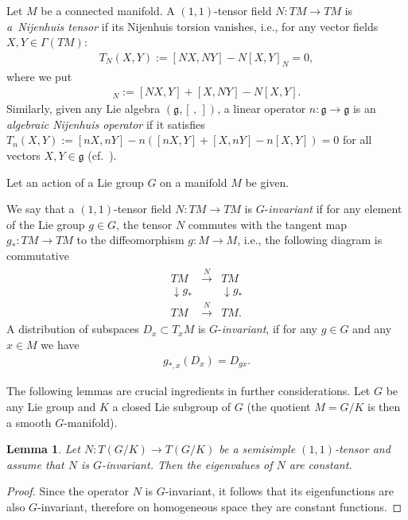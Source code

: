 \documentclass[pdftex]{sigma}
\numberwithin{equation}{section}
\newtheorem{Lemma}[Theorem]{Lemma}
\begin{document}
\begin{Definition}\label{nijdef}Let $M$ be a connected manifold. A $(1,1)$-tensor field $N\colon TM\to TM$ is \emph{a~Nijenhuis tensor} if its Nijenhuis torsion vanishes,
i.e., for any vector fields $X,Y\in \Gamma(TM)$:
\begin{gather*}
 T_N(X,Y):=[NX,NY]-N [X,Y]_N=0,
\end{gather*}
where we put
\begin{gather*}
[X,Y]_N:=[NX,Y]+[X,NY]-N[X,Y].
\end{gather*}
Similarly, given any Lie algebra $(\mathfrak{g}, [\,,\,])$, a linear operator $n\colon \mathfrak{g}\to\mathfrak{g}$ is an \emph{algebraic Nijenhuis operator} if it satisfies
$T_n(X,Y):=[nX,nY]-n ( [nX,Y] + [X,nY] - n[X,Y] )=0$ for all vectors $X,Y\in \mathfrak{g}$ (cf.~\cite{golsok2000,mks}).
\end{Definition}

Let an action of a Lie group $G$ on a manifold $M$ be given.

\begin{Definition}\label{def2}We say that a $(1,1)$-tensor field $N\colon TM\to TM$ is $G$-\emph{invariant} if for any element of the Lie group $ g\in G$, the tensor $N$ commutes with the tangent map $g_*\colon TM \to TM$ to the diffeomorphism $g\colon M\to M$, i.e., the following diagram is commutative
\begin{gather*}
\begin{matrix}
TM & \stackrel{N}{\longrightarrow}& TM \\
\downarrow g_*& & \downarrow g_* \\
TM &\stackrel{N}{\longrightarrow}&TM .
\end{matrix}
\end{gather*}
A distribution of subspaces $D_x \subset T_xM$ is $G$-\emph{invariant}, if for any $g\in G$ and any $x\in M$ we have
\begin{gather*}
g_{*,x}(D_x)=D_{gx}.
\end{gather*}
\end{Definition}

The following lemmas are crucial ingredients in further considerations. Let $G$ be any Lie group and $K$ a closed Lie subgroup of $G$ (the quotient $M=G/K$ is then a smooth $G$-manifold).

\begin{Lemma}\label{L1}Let $N\colon T(G/K) \to T(G/K)$ be a semisimple $(1,1)$-tensor and assume that $N$ is $G$-invariant. Then the eigenvalues of $N$ are constant.
\end{Lemma}
\begin{proof}Since the operator $N$ is $G$-invariant, it follows that its eigenfunctions are also $G$-invariant, therefore on homogeneous space they are constant functions.
\end{proof}
\end{document}
